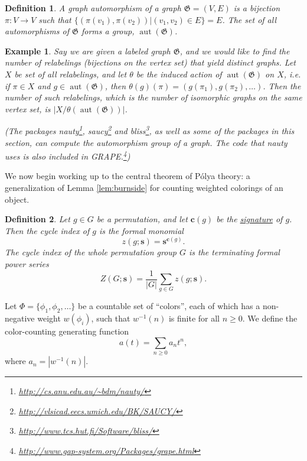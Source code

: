 \documentclass[12pt]{article}
\theoremstyle{plain}
\newtheorem{defin}{Definition}
\newtheorem{exa}{Example}
\DeclareMathOperator{\aut}{aut}
\begin{document}
\vspace{10px}

\begin{defin}
A \emph{graph automorphism} of a graph \( \mathfrak{G} = (V,E) \) is a bijection \( \pi : V \rightarrow V \) such that \( \{ (\pi(v_1), \pi(v_2)) | (v_1, v_2) \in E \} = E \).
The set of all automorphisms of \( \mathfrak{G} \) forms a group, \( \aut(\mathfrak{G}) \).
\end{defin}

\begin{exa}
Say we are given a labeled graph \( \mathfrak{G} \), and we would like to find the number of relabelings (bijections on the vertex set) that yield distinct graphs.
Let \( X \) be set of all relabelings, and let \( \theta \) be the induced action of \( \aut(\mathfrak{G}) \) on \( X \), i.e. if \( \pi \in X \) and \( g \in \aut(\mathfrak{G}) \), then
\( \theta(g)(\pi)  = ( g(\pi_1), g(\pi_2), \dots) \).
Then the number of such relabelings, which is the number of isomorphic graphs on the same vertex set, is \( \left|X / \theta ( \aut(\mathfrak{G}) ) \right| \).

(The packages nauty\footnote{
 \url{http://cs.anu.edu.au/~bdm/nauty/}
},
saucy\footnote{
 \url{http://vlsicad.eecs.umich.edu/BK/SAUCY/}
}
and bliss\footnote{
 \url{http://www.tcs.hut.fi/Software/bliss/}
}, as well as some of the packages in this section,
can compute the automorphism group of a graph.
The code that nauty uses is also included in GRAPE.\footnote{
 \url{http://www.gap-system.org/Packages/grape.html}
})
\end{exa}


We now begin working up to the central theorem of P\'olya theory: a generalization of Lemma \ref{lem:burnside} for counting weighted colorings of an object.

\begin{defin}
 Let \(g \in G\) be a permutation, and let \( \boldsymbol{c}(g) \) be the \hyperref[exa:signature]{signature} of \( g \).
 Then the \emph{cycle index} of \(g\) is the formal monomial
 \[ z(g; \boldsymbol{s} ) = \boldsymbol{s}^{\boldsymbol{c}(g) }. \]
The cycle index of
the whole permutation group
\( G \) is the terminating formal power series
\[ Z(G; \boldsymbol{s}) = \frac{1}{|G|} \sum_{g \in G} z(g; \boldsymbol{s}). \]
\end{defin}

Let \( \Phi = \{ \phi_1, \phi_2, \dots \} \) be a countable set of ``colors'', each of which has a non-negative weight \(w(\phi_i) \),
such that \( w^{-1}(n) \) is finite for all \( n \geq 0 \).
We define the color-counting generating function
\[ a(t) = \sum_{ n \geq 0 } a_n t^n, \]
where \( a_n = | w^{-1}(n) | \).
\end{document}
